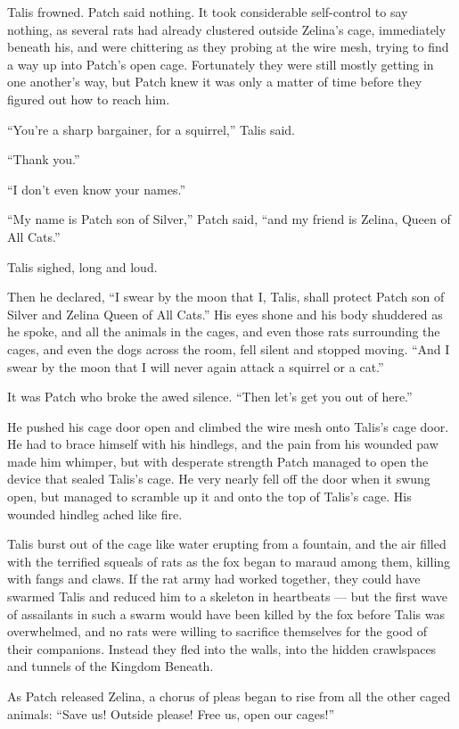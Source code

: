 \documentclass[ebook,oneside,openany,12pt]{memoir}
\begin{document}
Talis frowned. Patch said nothing. It took considerable self-control
to say nothing, as several rats had already clustered outside Zelina’s
cage, immediately beneath his, and were chittering as they probing at
the wire mesh, trying to find a way up into Patch’s open
cage. Fortunately they were still mostly getting in one another’s way,
but Patch knew it was only a matter of time before they figured out
how to reach him.

“You’re a sharp bargainer, for a squirrel,” Talis said.

“Thank you.”

“I don’t even know your names.”

“My name is Patch son of Silver,” Patch said, “and my friend is
Zelina, Queen of All Cats.”

Talis sighed, long and loud.

Then he declared, “I swear by the moon that I, Talis, shall protect
Patch son of Silver and Zelina Queen of All Cats.” His eyes shone and
his body shuddered as he spoke, and all the animals in the cages, and
even those rats surrounding the cages, and even the dogs across the
room, fell silent and stopped moving. “And I swear by the moon that I
will never again attack a squirrel or a cat.”

It was Patch who broke the awed silence. “Then let’s get you out of
here.”

He pushed his cage door open and climbed the wire mesh onto Talis’s
cage door. He had to brace himself with his hindlegs, and the pain
from his wounded paw made him whimper, but with desperate strength
Patch managed to open the device that sealed Talis’s cage. He very
nearly fell off the door when it swung open, but managed to scramble
up it and onto the top of Talis’s cage. His wounded hindleg ached like
fire.

Talis burst out of the cage like water erupting from a fountain, and
the air filled with the terrified squeals of rats as the fox began to
maraud among them, killing with fangs and claws. If the rat army had
worked together, they could have swarmed Talis and reduced him to a
skeleton in heartbeats — but the first wave of assailants in such a
swarm would have been killed by the fox before Talis was overwhelmed,
and no rats were willing to sacrifice themselves for the good of their
companions. Instead they fled into the walls, into the hidden
crawlspaces and tunnels of the Kingdom Beneath.

As Patch released Zelina, a chorus of pleas began to rise from all the
other caged animals: “Save us! Outside please! Free us, open our
cages!”
\end{document}

